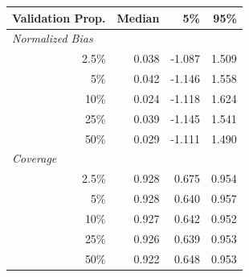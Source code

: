 
\begin{tabular}{r|rrr}
\toprule
Validation Prop. & Median & 5\% & 95\%\\
\midrule
\multicolumn{1}{l|}{\textit{Normalized Bias}}\\
2.5\% & 0.038 & -1.087 & 1.509\\
5\% & 0.042 & -1.146 & 1.558\\
10\% & 0.024 & -1.118 & 1.624\\
25\% & 0.039 & -1.145 & 1.541\\
50\% & 0.029 & -1.111 & 1.490\\
\midrule
%
\multicolumn{1}{l|}{\textit{Coverage}}\\
2.5\% & 0.928 & 0.675 & 0.954\\
5\% & 0.928 & 0.640 & 0.957\\
10\% & 0.927 & 0.642 & 0.952\\
25\% & 0.926 & 0.639 & 0.953\\
50\% & 0.922 & 0.648 & 0.953\\
\bottomrule
\end{tabular}
